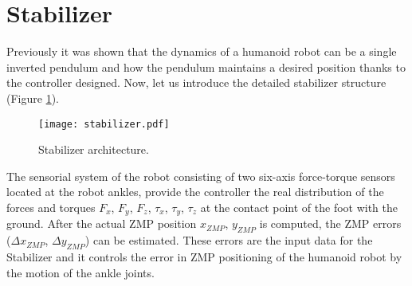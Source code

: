 \section{Stabilizer}
\label{chap:control_sec:stabilizer}
Previously it was shown that the dynamics of a humanoid robot can be a single inverted pendulum and how the pendulum maintains a desired position thanks to the controller designed. Now, let us introduce the detailed stabilizer structure (Figure \ref{fig:stabilizer}).

\begin{figure}[!h]
\centering
\texttt{[image: stabilizer.pdf]}
\caption{Stabilizer architecture.}
\label{fig:stabilizer}
\end{figure}

The sensorial system of the robot consisting of two six-axis force-torque sensors located at the robot ankles, provide the controller the real distribution of the forces and torques $F_x$, $F_y$, $F_z$, $\tau_x$, $\tau_y$, $\tau_z$ at the contact point of the foot with the ground. After the actual ZMP position $x_{ZMP}$, $y_{ZMP}$ is computed, the ZMP errors ($\Delta x_{ZMP}$, $\Delta y_{ZMP}$) can be estimated. These errors are the input data for the Stabilizer and it controls the error in ZMP positioning of the humanoid robot by the motion of the ankle joints.

